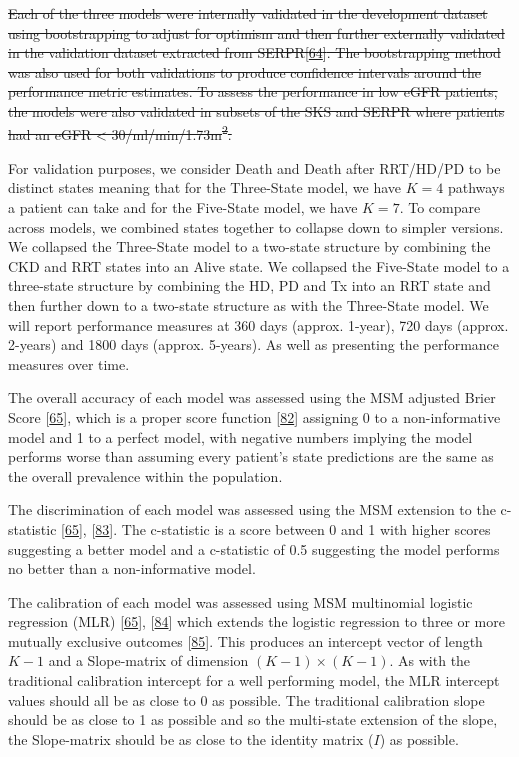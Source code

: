 \documentclass[
]{article}
\begin{document}
\sout{Each of the three models were internally validated in the development dataset using bootstrapping to adjust for optimism and then further externally validated in the validation dataset extracted from SERPR{[}\protect\hyperlink{ref-schomaker_bootstrap_2018}{64}{]}. The bootstrapping method was also used for both validations to produce confidence intervals around the performance metric estimates. To assess the performance in low eGFR patients, the models were also validated in subsets of the SKS and SERPR where patients had an eGFR \textless{} 30/ml/min/1.73m\textsuperscript{2}.}

For validation purposes, we consider Death and Death after RRT/HD/PD to be distinct states meaning that for the Three-State model, we have \(K=4\) pathways a patient can take and for the Five-State model, we have \(K=7\). To compare across models, we combined states together to collapse down to simpler versions. We collapsed the Three-State model to a two-state structure by combining the CKD and RRT states into an Alive state. We collapsed the Five-State model to a three-state structure by combining the HD, PD and Tx into an RRT state and then further down to a two-state structure as with the Three-State model. We will report performance measures at 360 days (approx. 1-year), 720 days (approx. 2-years) and 1800 days (approx. 5-years). As well as presenting the performance measures over time.

The overall accuracy of each model was assessed using the MSM adjusted Brier Score {[}\protect\hyperlink{ref-chap-performance-metrics}{65}{]}, which is a proper score function {[}\protect\hyperlink{ref-gneiting_strictly_2007}{82}{]} assigning 0 to a non-informative model and 1 to a perfect model, with negative numbers implying the model performs worse than assuming every patient's state predictions are the same as the overall prevalence within the population.

The discrimination of each model was assessed using the MSM extension to the c-statistic {[}\protect\hyperlink{ref-chap-performance-metrics}{65}{]}, {[}\protect\hyperlink{ref-calster_extending_2012-1}{83}{]}. The c-statistic is a score between 0 and 1 with higher scores suggesting a better model and a c-statistic of 0.5 suggesting the model performs no better than a non-informative model.

The calibration of each model was assessed using MSM multinomial logistic regression (MLR) {[}\protect\hyperlink{ref-chap-performance-metrics}{65}{]}, {[}\protect\hyperlink{ref-hoorde_assessing_2014}{84}{]} which extends the logistic regression to three or more mutually exclusive outcomes {[}\protect\hyperlink{ref-riley_prognosis_2019}{85}{]}. This produces an intercept vector of length \(K-1\) and a Slope-matrix of dimension \((K-1) \times (K-1)\). As with the traditional calibration intercept for a well performing model, the MLR intercept values should all be as close to 0 as possible. The traditional calibration slope should be as close to 1 as possible and so the multi-state extension of the slope, the Slope-matrix should be as close to the identity matrix (\(I\)) as possible.
\end{document}
